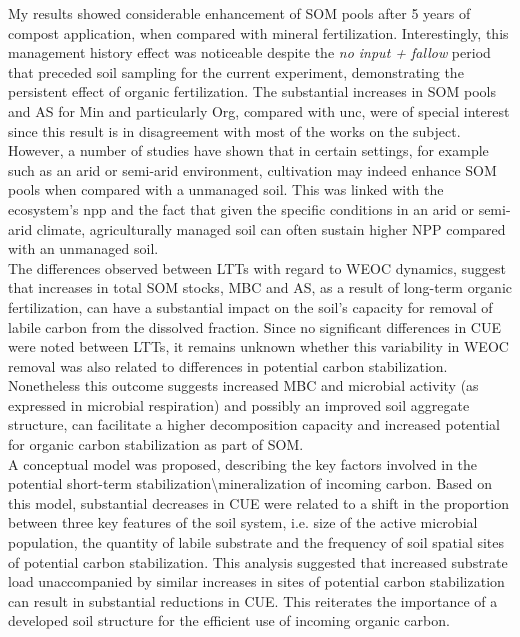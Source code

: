 	My results showed considerable enhancement of SOM pools after 5 years of compost application, when compared with mineral fertilization. Interestingly, this management history effect was noticeable despite the \textit{no input + fallow} period that preceded soil sampling for the current experiment, demonstrating the persistent effect of organic fertilization. The substantial increases in SOM pools and AS for Min and particularly Org, compared with \gls{unc}, were of special interest since this result is in disagreement with most  of the works on the subject. However, a number of studies have shown that in certain settings, for example such as an arid or semi-arid environment, cultivation may indeed enhance SOM pools when compared with a unmanaged soil. This was linked with the ecosystem's \gls{npp} and the fact that given the specific conditions in an arid or semi-arid climate, agriculturally managed soil can often sustain higher NPP compared with an unmanaged soil.\\
	The differences observed between LTTs with regard to WEOC dynamics, suggest that increases in total SOM stocks, MBC and AS, as a result of long-term organic fertilization, can have a substantial impact on the soil's capacity for removal of labile carbon from the dissolved fraction. Since no significant differences in CUE were noted between LTTs, it remains unknown whether this variability in WEOC removal was also related to differences in potential carbon stabilization. Nonetheless this outcome suggests increased MBC and microbial activity (as expressed in microbial respiration) and possibly an improved soil aggregate structure, can facilitate a higher decomposition capacity and increased potential for organic carbon stabilization as part of SOM.\\
	A conceptual model was proposed, describing the key factors involved in the potential short-term stabilization\textbackslash mineralization of incoming carbon. Based on this model, substantial decreases in CUE were related to a shift in the proportion between three key features of the soil system, i.e. size of the active microbial population, the quantity of labile substrate and the frequency of soil spatial sites of potential carbon stabilization. This analysis suggested that increased substrate load unaccompanied by similar increases in sites of potential carbon stabilization can result in substantial reductions in CUE. This reiterates the importance of a developed soil structure for the efficient use of incoming organic carbon.\\
